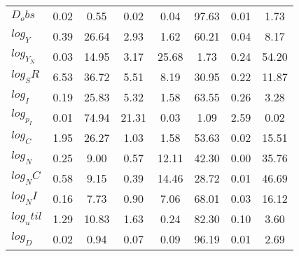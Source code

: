 \begin{center}
\begin{longtable}{lccccccc}
$D_obs     $	 & 	        0.02	 & 	        0.55	 & 	        0.02	 & 	        0.04	 & 	       97.63	 & 	        0.01	 & 	        1.73 \\ 
$log_Y     $	 & 	        0.39	 & 	       26.64	 & 	        2.93	 & 	        1.62	 & 	       60.21	 & 	        0.04	 & 	        8.17 \\ 
$log_Y_N   $	 & 	        0.03	 & 	       14.95	 & 	        3.17	 & 	       25.68	 & 	        1.73	 & 	        0.24	 & 	       54.20 \\ 
$log_SR    $	 & 	        6.53	 & 	       36.72	 & 	        5.51	 & 	        8.19	 & 	       30.95	 & 	        0.22	 & 	       11.87 \\ 
$log_I     $	 & 	        0.19	 & 	       25.83	 & 	        5.32	 & 	        1.58	 & 	       63.55	 & 	        0.26	 & 	        3.28 \\ 
$log_p_I   $	 & 	        0.01	 & 	       74.94	 & 	       21.31	 & 	        0.03	 & 	        1.09	 & 	        2.59	 & 	        0.02 \\ 
$log_C     $	 & 	        1.95	 & 	       26.27	 & 	        1.03	 & 	        1.58	 & 	       53.63	 & 	        0.02	 & 	       15.51 \\ 
$log_N     $	 & 	        0.25	 & 	        9.00	 & 	        0.57	 & 	       12.11	 & 	       42.30	 & 	        0.00	 & 	       35.76 \\ 
$log_NC    $	 & 	        0.58	 & 	        9.15	 & 	        0.39	 & 	       14.46	 & 	       28.72	 & 	        0.01	 & 	       46.69 \\ 
$log_NI    $	 & 	        0.16	 & 	        7.73	 & 	        0.90	 & 	        7.06	 & 	       68.01	 & 	        0.03	 & 	       16.12 \\ 
$log_util  $	 & 	        1.29	 & 	       10.83	 & 	        1.63	 & 	        0.24	 & 	       82.30	 & 	        0.10	 & 	        3.60 \\ 
$log_D     $	 & 	        0.02	 & 	        0.94	 & 	        0.07	 & 	        0.09	 & 	       96.19	 & 	        0.01	 & 	        2.69 \\ 
\end{longtable}
 \end{center}
